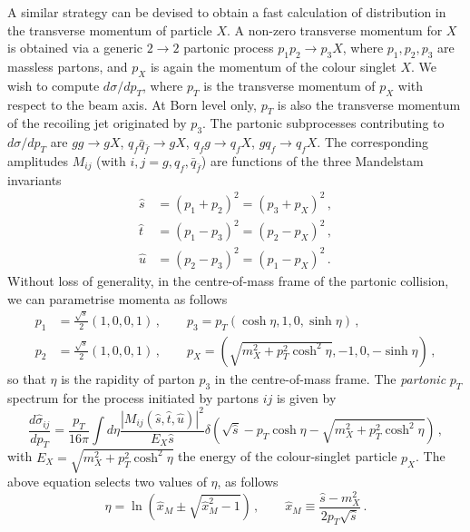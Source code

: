 \documentclass[12pt,a4wide]{article}
\begin{document}
A similar strategy can be devised to obtain a fast calculation of
distribution in the transverse momentum of particle $X$. A non-zero
transverse momentum for $X$ is obtained via a generic $2\to 2$
partonic process $p_1 p_2 \to p_3 X$, where $p_1,p_2,p_3$ are massless
partons, and $p_X$ is again the momentum of the colour singlet $X$. We
wish to compute $d\sigma/dp_T$, where $p_T$ is the transverse momentum
of $p_X$ with respect to the beam axis. At Born level only, $p_T$ is
also the transverse momentum of the recoiling jet originated by
$p_3$. The partonic subprocesses contributing to $d\sigma/dp_T$ are
$gg\to g X$, $q_f \bar q_{\bar f} \to g X$, $q_f g\to q_f X$,
$gq_f \to q_fX$. The corresponding amplitudes $M_{ij}$ (with
$i,j=g,q_f,\bar q_{\bar f}$) are functions of the three Mandelstam
invariants
\begin{equation}
  \label{eq:Mandelstam}
  \begin{split}
  \hat s & = (p_1+p_2)^2 = (p_3+p_X)^2 \,,\\
  \hat t & = (p_1-p_3)^2 = (p_2-p_X)^2 \,,\\
  \hat u & = (p_2-p_3)^2 = (p_1-p_X)^2 \,.
  \end{split}
\end{equation}
Without loss of generality, in the centre-of-mass frame of the
partonic collision, we can parametrise momenta as follows
\begin{equation}
  \label{eq:momenta}
  \begin{split}
  p_1&=\frac{\sqrt s}{2}(1,0,0,1)\,,\qquad p_3 = p_T(\cosh\eta,1,0,\sinh\eta)\,,\\
  p_2&=\frac{\sqrt s}{2}(1,0,0,1)\,,\qquad p_X = (\sqrt{m_X^2+p^2_T\cosh^2\eta},-1,0,-\sinh\eta)\,,
  \end{split}
\end{equation}
so that $\eta$ is the rapidity of parton $p_3$ in the
centre-of-mass frame. The {\em partonic} $p_T$ spectrum for the
process initiated by partons $ij$ is given by
\begin{equation}
  \label{eq:partonic-pt}
  \frac{d\hat \sigma_{ij}}{dp_T} = \frac{p_T}{16\pi}\int d\eta \frac{|M_{ij}(\hat s,\hat t,\hat u)|^2}{E_X \hat s} \delta\left(\sqrt{\hat s} - p_T\cosh\eta-\sqrt{m_X^2+p^2_T\cosh^2\eta}\right)\,, 
\end{equation}
with $E_X=\sqrt{m_X^2+p^2_T\cosh^2\eta}$ the energy of the colour-singlet
particle $p_X$.  The above equation selects two values of $\eta$, as
follows
\begin{equation}
\label{eq:eta-values}
  \eta = \ln(\hat x_M \pm \sqrt{\hat x_M^2-1})\,,\qquad \hat x_M\equiv\frac{\hat s-m_X^2}{2 p_T \sqrt{\hat s} }\,.
\end{equation}
\end{document}
